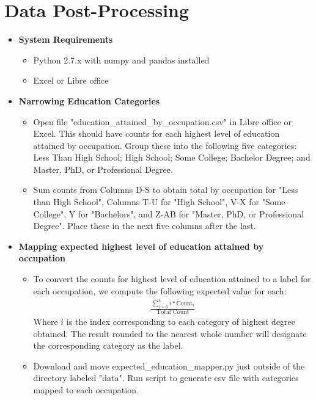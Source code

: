 \documentclass[paper=a4, fontsize=11pt]{scrartcl} %
\numberwithin{equation}{section} %
\numberwithin{figure}{section} %
\numberwithin{table}{section} %
\begin{document}
\section{Data Post-Processing}

\begin{itemize}
	\item \textbf{System Requirements}
	\begin{itemize}
		\item Python 2.7.x with numpy and pandas installed
		\item Excel or Libre office
	\end{itemize}
	\item \textbf{Narrowing Education Categories}
	\begin{itemize}
		\item Open file "education\_attained\_by\_occupation.csv" in Libre office or Excel.  This should have counts for each highest level of education attained by occupation.  Group these into the following five categories: Less Than High School; High School; Some College; Bachelor Degree; and Master, PhD, or Professional Degree.
		\item Sum counts from Columns D-S to obtain total by occupation for "Less than High School", Columns T-U for "High School", V-X for "Some College", Y for "Bachelors", and Z-AB for "Master, PhD, or Professional Degree".  Place these in the next five columns after the last.  
	\end{itemize}
	\item \textbf{Mapping expected highest level of education attained by occupation}
	\begin{itemize}
		\item To convert the counts for highest level of education attained to a label for each occupation, we compute the following expected value for each:
		\begin{align*}
		\frac{\sum_{i=0}^{4}{i*\text{Count}_i}}{\text{Total Count}}
		\end{align*}
		Where $i$ is the index corresponding to each category of highest degree obtained.  The result rounded to the nearest whole number will designate the corresponding category as the label.
		\item Download and move expected\_education\_mapper.py just outside of the directory labeled "data".  Run script to generate csv file with categories mapped to each occupation.
	\end{itemize}
\end{itemize}
\end{document}

